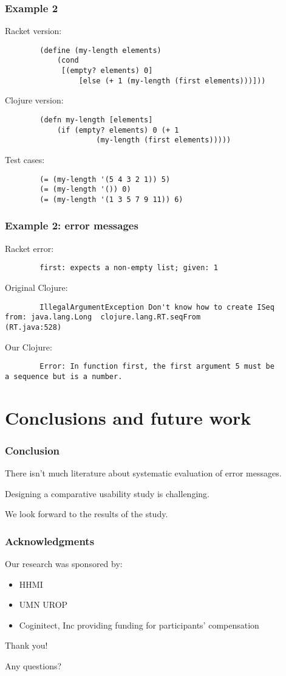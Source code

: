 \documentclass{beamer}
\begin{document}
\begin{frame}[fragile]
\frametitle{Example 2}
Racket version:
\begin{verbatim}
		(define (my-length elements)
  			(cond
 			 [(empty? elements) 0]
			 	 [else (+ 1 (my-length (first elements)))]))
\end{verbatim}
Clojure version:  
\begin{verbatim}
		(defn my-length [elements]
 			(if (empty? elements) 0 (+ 1 
                     (my-length (first elements)))))
\end{verbatim}
Test cases:
\begin{verbatim}
		(= (my-length '(5 4 3 2 1)) 5)
		(= (my-length '()) 0)
		(= (my-length '(1 3 5 7 9 11)) 6)
\end{verbatim}
\end{frame}


\begin{frame}[fragile]
\frametitle{Example 2: error messages}
Racket error:
\begin{verbatim}
		first: expects a non-empty list; given: 1	
\end{verbatim}

Original Clojure:
\begin{verbatim}
		IllegalArgumentException Don't know how to create ISeq  
from: java.lang.Long  clojure.lang.RT.seqFrom 
(RT.java:528)
\end{verbatim}

Our Clojure: 
\begin{verbatim}
		Error: In function first, the first argument 5 must be 
a sequence but is a number.
\end{verbatim}
\end{frame}

\section{Conclusions and future work} 

\begin{frame}
\frametitle{Conclusion}
There isn't much literature about systematic evaluation of error messages.

Designing a comparative usability study is challenging.

We look forward to the results of the study.  

\end{frame}

\begin{frame}
\frametitle{Acknowledgments}
	Our research was sponsored by:
	\begin{itemize}
	\item HHMI
	\item UMN UROP
          \item Coginitect, Inc providing funding for participants' compensation 
	\end{itemize}
	
	
	{\centering
	\noindent
	Thank you! \par
	Any questions? \par
	}
\end{frame}
\end{document}
